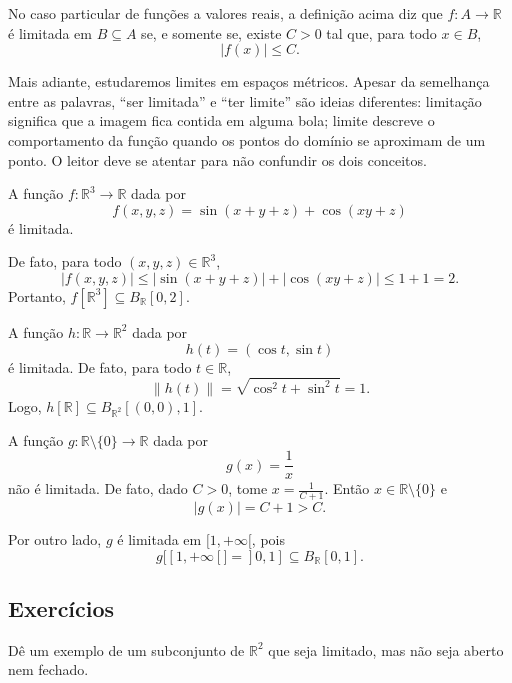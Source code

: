 No caso particular de funções a valores reais, a definição acima diz que $f:A\to\mathbb R$ é limitada em $B\subseteq A$ se, e somente se, existe $C>0$ tal que, para todo $x\in B$,
\[
    |f(x)|\leq C.
\]

Mais adiante, estudaremos limites em espaços métricos.
Apesar da semelhança entre as palavras, ``ser limitada'' e ``ter limite'' são ideias diferentes: limitação significa que a imagem fica contida em alguma bola; limite descreve o comportamento da função quando os pontos do domínio se aproximam de um ponto.
O leitor deve se atentar para não confundir os dois conceitos.

\begin{example}
    A função $f:\mathbb R^3\to\mathbb R$ dada por
    \[
        f(x,y,z)=\sin(x+y+z)+\cos(xy+z)
    \]
    é limitada.

    De fato, para todo $(x,y,z)\in\mathbb R^3$,
    \[
        |f(x,y,z)|\leq |\sin(x+y+z)|+|\cos(xy+z)|\leq 1+1=2.
    \]
    Portanto, $f[\mathbb R^3]\subseteq B_{\mathbb R}[0,2]$.
\end{example}

\begin{example}
    A função $h:\mathbb R\to\mathbb R^2$ dada por
    \[
        h(t)=(\cos t,\sin t)
    \]
    é limitada.
    De fato, para todo $t\in\mathbb R$,
    \[
        \|h(t)\|=\sqrt{\cos^2 t+\sin^2 t}=1.
    \]
    Logo, $h[\mathbb R]\subseteq B_{\mathbb R^2}[(0,0),1]$.
\end{example}

\begin{example}
    A função $g:\mathbb R\setminus\{0\}\to\mathbb R$ dada por
    \[
        g(x)=\frac{1}{x}
    \]
    não é limitada.
    De fato, dado $C>0$, tome $x=\frac{1}{C+1}$.
    Então $x\in\mathbb R\setminus\{0\}$ e
    \[
        |g(x)|=C+1>C.
    \]

    Por outro lado, $g$ é limitada em $[1,+\infty[$, pois
    \[
        g\bigl[[1,+\infty[\bigr] = ]0,1]\subseteq B_{\mathbb R}[0,1].
    \]
\end{example}

\subsection*{Exercícios}

\begin{exercise}
    Dê um exemplo de um subconjunto de $\mathbb R^2$ que seja limitado, mas não seja aberto nem fechado.
\end{exercise}

